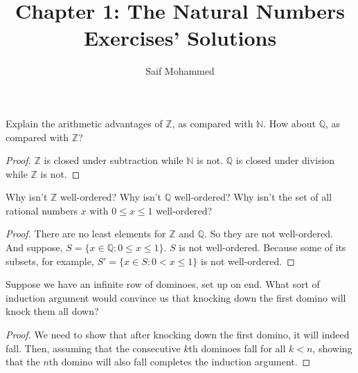 \documentclass[12pt]{article}
\newenvironment{problem}[2][Problem]{\begin{trivlist}
\item[\hskip \labelsep {\bfseries #1}\hskip \labelsep {\bfseries #2.}]}{\end{trivlist}}
\begin{document}
 
%
%
 
\title{Chapter 1: The Natural Numbers Exercises' Solutions} %
\author{Saif Mohammed} %
\maketitle
\begin{problem}{a}
Explain the arithmetic advantages of \( \mathbb{Z} \), as compared with \( \mathbb{N} \). How about \( \mathbb{Q} \), as compared
with \( \mathbb{Z} \)?
\end{problem}

\begin{proof}
$\mathbb{Z}$ is closed under subtraction while $\mathbb{N}$ is not. $\mathbb{Q}$ is closed under division while $\mathbb{Z}$ is not.

\end{proof}

\begin{problem}{b}
Why isn't \( \mathbb{Z} \) well-ordered? Why isn't \( \mathbb{Q} \) well-ordered? Why isn't the set of all rational
numbers \( x \) with \( 0 \leq x \leq 1 \) well-ordered?

\end{problem}

\begin{proof}
There are no least elements for $\mathbb{Z}$ and $\mathbb{Q}$. So they are not well-ordered. \\
And suppose, $S = \{ x\in \mathbb{Q}: 0 \leq x \leq 1 \}$. $S$ is not well-ordered. Because some of its subsets, for example, $S' = \{ x\in S: 0 < x \leq 1 \}$ is not well-ordered.

\end{proof}

\begin{problem}{c}
Suppose we have an infinite row of dominoes, set up on end. What sort of induction
argument would convince us that knocking down the first domino will knock them all
down?

\end{problem}

\begin{proof}
We need to show that after knocking down the first domino, it will indeed fall. Then, assuming that the consecutive \(k\)th dominoes fall for all \(k < n\), showing that the \(n\)th domino will also fall completes the induction argument.

\end{proof}
\end{document}
